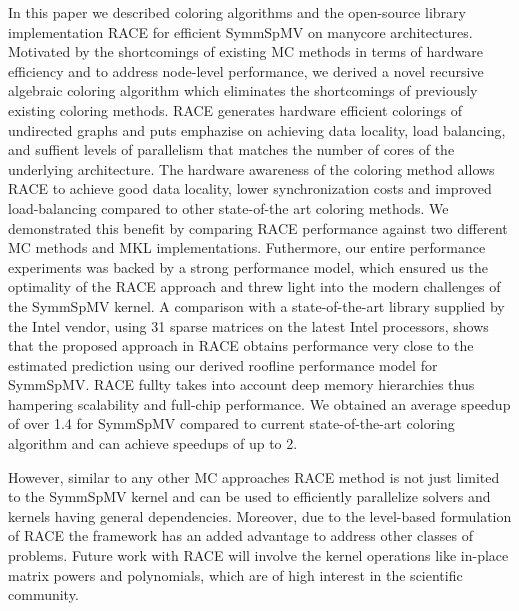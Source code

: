 In this paper we described coloring algorithms and the 
open-source library implementation \acrshort{RACE} for efficient \acrfull{SymmSpMV} on
manycore architectures. Motivated by the shortcomings of existing \acrshort{MC} methods in  terms of hardware efficiency 
and to address node-level performance, we derived a novel recursive algebraic  coloring algorithm 
which eliminates the shortcomings of previously existing coloring methods.
\acrshort{RACE} generates hardware efficient \DK colorings of undirected graphs and puts 
emphazise on achieving data locality, load balancing, and suffient levels of parallelism that matches the 
number of cores  of the underlying architecture. The hardware awareness of the 
coloring method allows \acrshort{RACE} to achieve good data locality, lower synchronization costs and 
improved load-balancing compared to other state-of-the art coloring methods.
We demonstrated this benefit  by comparing  \acrshort{RACE} performance against two different 
\acrshort{MC} methods and \acrshort{MKL} implementations. Futhermore, our entire performance experiments
was backed by a strong performance model,  which ensured us the optimality of the \acrshort{RACE} approach
and threw light into the modern challenges  of the \acrshort{SymmSpMV} kernel.
A comparison with a state-of-the-art library  supplied by the Intel vendor, using 31 sparse matrices 
on the latest Intel  processors, shows that the proposed approach in \acrshort{RACE}
obtains performance very close to the estimated prediction using our derived roofline performance model for 
\acrfull{SymmSpMV}. \acrshort{RACE} fullty takes into account  deep memory hierarchies thus hampering 
scalability and full-chip performance. We obtained an average speedup of over 1.4 for 
\acrshort{SymmSpMV} compared to current 
state-of-the-art  coloring algorithm and can achieve speedups of up to 2.




However, similar to any other \acrshort{MC} approaches \acrshort{RACE} method 
is not just limited to the \acrshort{SymmSpMV} kernel
and can be used to efficiently parallelize solvers and kernels 
having general \DK dependencies. Moreover, due to the level-based formulation
of \acrshort{RACE} the framework has an added advantage to address 
other classes of problems. Future work with \acrshort{RACE} will involve the
kernel operations like in-place matrix powers and polynomials, which are of 
high interest in the scientific community. 



